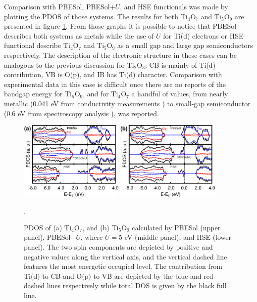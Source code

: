 Comparison with PBESol, PBESol$+U$, and HSE functionals was made by plotting the PDOS of those systems. The results for both Ti$_4$O$_7$ and Ti$_5$O$_9$ are presented in figure \ref{fig:dos-magneli-prb}. From those graphs it is possible to notice that PBESol describes both systems as metals while the use of $U$ for Ti(d) electrons or HSE functional describe Ti$_4$O$_7$ and Ti$_5$O$_9$ as a small gap and large gap semiconductors respectively. The description of the electronic structure in these cases can be analogous to the previous discussion for Ti$_2$O$_3$: CB is mainly of Ti(d) contribution, VB is O(p), and IB has Ti(d) character. Comparison with experimental data in this case is difficult once there are no reports of the bandgap energy for Ti$_5$O$_9$, and for Ti$_4$O$_7$ a handful of values, from nearly metallic (0.041 eV from conductivity measurements \cite{Mulay1970}) to small-gap semiconductor (0.6 eV from spectroscopy analysis \cite{Abbate1995}), was reported.
\begin{center}
  \begin{figure}[ht!]
      \begin{center}
        \includegraphics[width=0.45\textwidth]{img/dos-ti4o7-prb.jpg}
        \includegraphics[width=0.45\textwidth]{img/dos-ti5o9-prb.jpg} 
      \end{center}
      \caption{PDOS of (a) Ti$_4$O$_7$, and (b) Ti$_5$O$_9$ calculated by PBESol (upper panel), PBESol$+U$, where $U = 5$ eV (middle panel), and HSE (lower panel). The two spin components are depicted by positive and negative values along the vertical axis, and the vertical dashed line features the most energetic occupied level. The contribution from Ti(d) to CB and O(p) to VB are depicted by the blue and red dashed lines respectively while total DOS is given by the black full line.}.
      \label{fig:dos-magneli-prb} 
  \end{figure}
\end{center}

